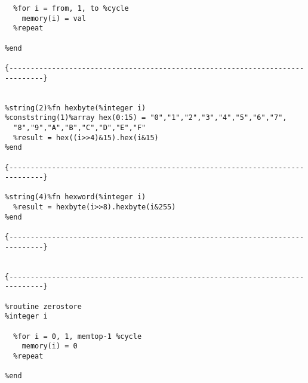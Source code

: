\begin{verbatim}
  %for i = from, 1, to %cycle
    memory(i) = val
  %repeat

%end

{------------------------------------------------------------------------------}


%string(2)%fn hexbyte(%integer i)
%conststring(1)%array hex(0:15) = "0","1","2","3","4","5","6","7",
  "8","9","A","B","C","D","E","F"
  %result = hex((i>>4)&15).hex(i&15)
%end

{------------------------------------------------------------------------------}

%string(4)%fn hexword(%integer i)
  %result = hexbyte(i>>8).hexbyte(i&255)
%end

{------------------------------------------------------------------------------}


{------------------------------------------------------------------------------}

%routine zerostore
%integer i

  %for i = 0, 1, memtop-1 %cycle
    memory(i) = 0
  %repeat

%end
\end{verbatim}
